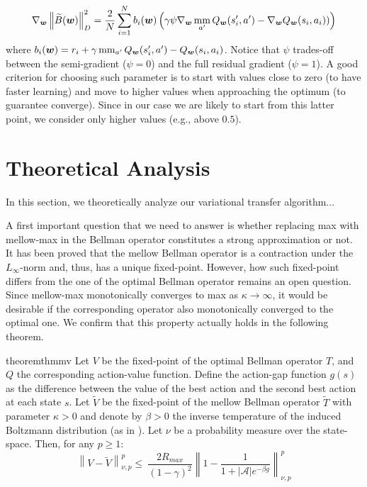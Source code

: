 \documentclass{article}
\newcommand{\mm}{\operatornamewithlimits{mm}}
\newcommand{\wt}[1]{\widetilde{#1}}
\newcommand{\norm}[1]{\left\lVert #1 \right\rVert}
\newcommand{\abs}[1]{\left\lvert #1 \right\rvert}
\begin{document}
\begin{equation}
\nabla_{\bm{w}}\norm{\wt{B}(\bm{w})}_{D}^2 = \frac{2}{N}\sum_{i=1}^N b_i(\bm{w})\left( \gamma\psi\nabla_{\bm{w}}\mm_{a'}Q_{\bm{w}}(s_i',a') - \nabla_{\bm{w}}Q_{\bm{w}}(s_i,a_i)) \right)
\end{equation}
where $b_i(\bm{w}) = r_i + \gamma\mm_{a'}Q_{\bm{w}}(s_i',a') - Q_{\bm{w}}(s_i,a_i)$. Notice that $\psi$ trades-off between the semi-gradient ($\psi = 0$) and the full residual gradient ($\psi = 1$). A good criterion for choosing such parameter is to start with values close to zero (to have faster learning) and move to higher values when approaching the optimum (to guarantee converge). Since in our case we are likely to start from this latter point, we consider only higher values (e.g., above $0.5$).

\section{Theoretical Analysis}\label{sec:theory}

In this section, we theoretically analyze our variational transfer algorithm...

A first important question that we need to answer is whether replacing max with mellow-max in the Bellman operator constitutes a strong approximation or not. It has been proved \cite{}  that the mellow Bellman operator is a contraction under the $L_{\infty}$-norm and, thus, has a unique fixed-point.  However, how such fixed-point differs from the one of the optimal Bellman operator remains an open question. Since mellow-max monotonically converges to max as $\kappa \rightarrow \infty$, it would be desirable if the corresponding operator also monotonically converged to the optimal one. We confirm that this property actually holds in the following theorem.

\begin{restatable}{theorem}{thmmv} \label{th:mmv}
Let $V$ be the fixed-point of the optimal Bellman operator $T$, and $Q$ the corresponding action-value function. Define the action-gap function $g(s)$ as the difference between the value of the best action and the second best action at each state $s$. Let $\wt{V}$ be the fixed-point of the mellow Bellman operator $\wt{T}$ with parameter $\kappa > 0$ and denote by $\beta > 0$ the inverse temperature of the induced Boltzmann distribution (as in \cite{}). Let $\nu$ be a probability measure over the state-space. Then, for any $p \geq 1$:
\begin{equation}
\norm{V-\wt{V}}_{\nu,p}^p \leq\ \frac{2R_{max}}{(1-\gamma)^2}\norm{1 - \frac{1}{1 + \abs{\mathcal{A}}e^{-\beta g}}}_{\nu,p}^p
\end{equation}
\end{restatable}
\end{document}
